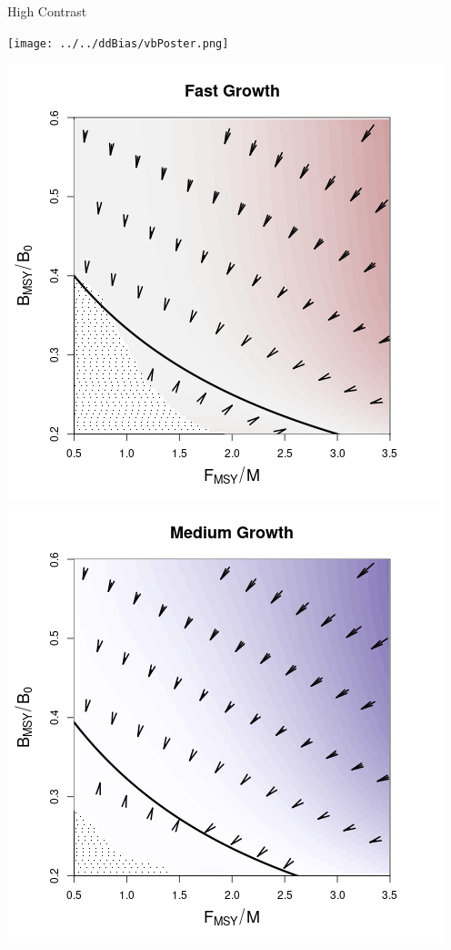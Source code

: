 \documentclass[ xcolor = pdftex, dvipsnames, table ]{beamer}
\begin{document}
%
\begin{frame}{High Contrast}
	\begin{minipage}[h!]{0.51\textwidth}
	\texttt{[image: ../../ddBias/vbPoster.png]}
	\end{minipage}
	\begin{minipage}[h!]{0.47\textwidth}
	\centering
	\vspace{-0.25cm}
	\includegraphics[height=0.28\textheight]{../../ddBias/directionalBiasDDSubExpT45N300AS0.1K10PresReds 2.png}\\ %
        \includegraphics[height=0.28\textheight]{../../ddBias/directionalBiasDDSubExpT45N150A0-1AS4K0.2N38Purples.png}\\ %

\end{minipage}
\end{frame}
\end{document}
